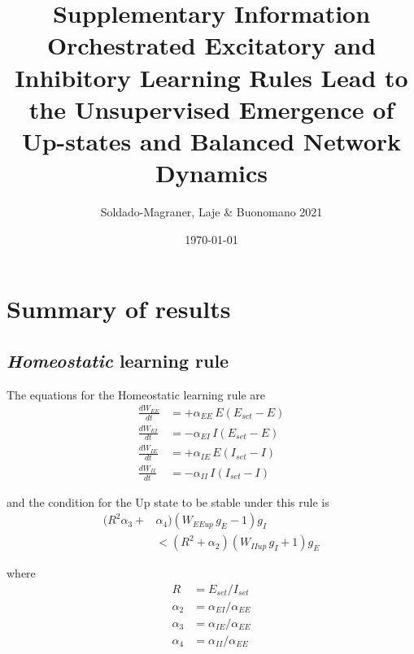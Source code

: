 \documentclass[
twocolumn,
]{article}
\newcommand{\EE}{\mathit{EE}}
\newcommand{\EI}{\mathit{EI}}
\newcommand{\IE}{\mathit{IE}}
\newcommand{\II}{\mathit{II}}
\newcommand{\set}{\mathit{set}}
\newcommand{\up}{\mathit{up}}
\begin{document}
\title{\vspace{-2.0cm}Supplementary Information\\{\bf Orchestrated Excitatory and Inhibitory Learning Rules Lead to the Unsupervised Emergence of Up-states and Balanced Network Dynamics}}
\author{Soldado-Magraner, Laje \& Buonomano 2021}
\date{\today}

\maketitle

\tableofcontents

\section{Summary of results}

\subsection{{\em Homeostatic} learning rule}

The equations for the Homeostatic learning rule are
\begin{equation}
\begin{aligned}
\frac{dW_{\EE}}{dt} & = +\alpha_{\EE} \, E (E_{\set} - E) \\
\frac{dW_{\EI}}{dt} & = -\alpha_{\EI} \, I (E_{\set} - E) \\
\frac{dW_{\IE}}{dt} & = +\alpha_{\IE} \, E (I_{\set} - I) \\
\frac{dW_{\II}}{dt} & = -\alpha_{\II} \, I (I_{\set} - I)
\end{aligned}
\label{eq.SH_summary}
\end{equation}

\noindent and the condition for the Up state to be stable under this rule is
\begin{equation}
\begin{aligned}
(R^2 \alpha_3 + & \alpha_4)(W_{\EE\up} \, g_E  - 1)g_I \\
& < (R^2 + \alpha_2)(W_{\II\up} \, g_I + 1)g_E
\label{eq.SH_stable_cond_summary}
\end{aligned}
\end{equation}

\noindent where
\begin{displaymath}
\begin{aligned}
R & = E_{\set}/I_{\set} \\
\alpha_2 & = \alpha_{\EI}/\alpha_{\EE} \\
\alpha_3 & = \alpha_{\IE}/\alpha_{\EE} \\
\alpha_4 & = \alpha_{\II}/\alpha_{\EE}
\end{aligned}
\end{displaymath}
\end{document}
